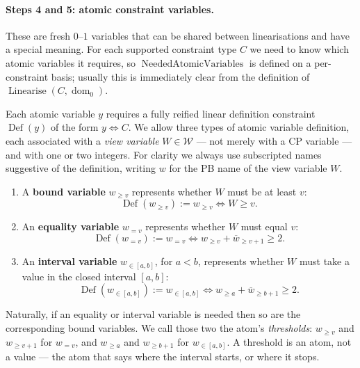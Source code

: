 \documentclass[11pt,a4paper]{article}
\theoremstyle{plain}
\theoremstyle{definition}
\theoremstyle{remark}
\newcommand{\fname}[1]{\ensuremath{\operatorname{#1}}}
\newcommand{\Def}{\fname{Def}}
\newcommand{\dm}{\fname{dom}}
\newcommand{\Linearise}{\fname{Linearise}}
\newcommand{\NeededAtomicVariables}{\fname{NeededAtomicVariables}}
\newcommand{\atge}[2]{#1_{\geq #2}}
\newcommand{\ateq}[2]{#1_{= #2}}
\newcommand{\atin}[3]{#1_{\in[#2,#3]}}
\newcommand{\natge}[2]{\overline{#1}_{\geq #2}}
\begin{document}
\paragraph{Steps 4 and 5: atomic constraint variables.}
These are fresh $0$--$1$ variables that can be shared between linearisations
and have a special meaning.  For each supported constraint type $C$ we need to
know which atomic variables it requires, so $\NeededAtomicVariables$ is
defined on a per-constraint basis; usually this is immediately clear from the
definition of $\Linearise(C,\dm_0)$.

Each atomic variable $y$ requires a fully reified linear definition constraint
$\Def(y)$ of the form $y\Leftrightarrow C$.  We allow three types of atomic
variable definition, each associated with a \emph{view variable}
$W\in\mathcal W$ --- not merely with a CP variable --- and with one or two
integers.  For clarity we always use subscripted names suggestive of the
definition, writing $w$ for the PB name of the view variable $W$.

\begin{enumerate}[leftmargin=2.2em]
  \item A \textbf{bound variable} $\atge{w}{v}$ represents whether $W$ must be
    at least $v$:
    \begin{equation}
      \Def(\atge{w}{v}) := \atge{w}{v} \Leftrightarrow W \geq v .
      \label{eq:defge}
    \end{equation}
  \item An \textbf{equality variable} $\ateq{w}{v}$ represents whether $W$ must
    equal $v$:
    \begin{equation}
      \Def(\ateq{w}{v}) := \ateq{w}{v} \Leftrightarrow
        \atge{w}{v} + \natge{w}{v+1} \geq 2 .
      \label{eq:defeq}
    \end{equation}
  \item An \textbf{interval variable} $\atin{w}{a}{b}$, for $a<b$, represents
    whether $W$ must take a value in the closed interval $[a,b]$:
    \begin{equation}
      \Def(\atin{w}{a}{b}) := \atin{w}{a}{b} \Leftrightarrow
        \atge{w}{a} + \natge{w}{b+1} \geq 2 .
      \label{eq:defin}
    \end{equation}
\end{enumerate}

Naturally, if an equality or interval variable is needed then so are the
corresponding bound variables.  We call those two the atom's \emph{thresholds}:
$\atge{w}{v}$ and $\atge{w}{v+1}$ for $\ateq{w}{v}$, and $\atge{w}{a}$ and
$\atge{w}{b+1}$ for $\atin{w}{a}{b}$.  A threshold is an atom, not a value ---
the atom that says where the interval starts, or where it stops.
\end{document}
